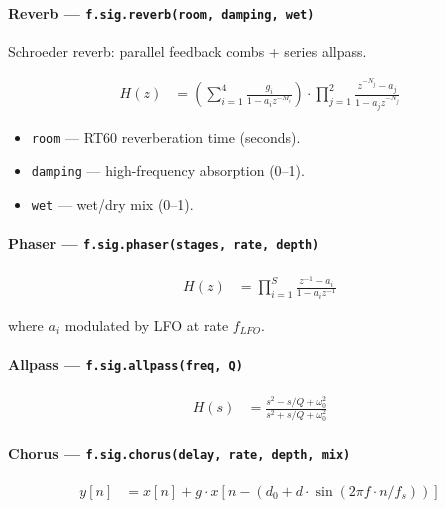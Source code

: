 \paragraph{Reverb --- \texttt{f.sig.reverb(room, damping, wet)}}
Schroeder reverb: parallel feedback combs + series allpass.

\begin{align}
H(z) &= \left(\sum_{i=1}^{4} \frac{g_i}{1 - a_i z^{-M_i}}\right) \cdot \prod_{j=1}^{2} \frac{z^{-N_j} - a_j}{1 - a_j z^{-N_j}} \label{eq:sig-reverb}
\end{align}

\begin{itemize}
\item \texttt{room} --- RT60 reverberation time (seconds).
\item \texttt{damping} --- high-frequency absorption (0--1).
\item \texttt{wet} --- wet/dry mix (0--1).
\end{itemize}

\paragraph{Phaser --- \texttt{f.sig.phaser(stages, rate, depth)}}

\begin{align}
H(z) &= \prod_{i=1}^{S} \frac{z^{-1} - a_i}{1 - a_i z^{-1}} \label{eq:sig-phaser}
\end{align}

where $a_i$ modulated by LFO at rate $f_{LFO}$.

\paragraph{Allpass --- \texttt{f.sig.allpass(freq, Q)}}

\begin{align}
H(s) &= \frac{s^2 - s/Q + \omega_0^2}{s^2 + s/Q + \omega_0^2} \label{eq:sig-allpass-single}
\end{align}

\paragraph{Chorus --- \texttt{f.sig.chorus(delay, rate, depth, mix)}}

\begin{align}
y[n] &= x[n] + g \cdot x[n - (d_0 + d \cdot \sin(2\pi f \cdot n / f_s))] \label{eq:sig-chorus}
\end{align}

